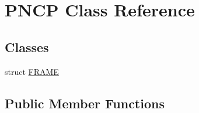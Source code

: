 \hypertarget{class_p_n_c_p}{}\section{P\+N\+CP Class Reference}
\label{class_p_n_c_p}
\subsection*{Classes}
\begin{DoxyCompactItemize}
\item 
struct \hyperlink{struct_p_n_c_p_1_1_f_r_a_m_e}{F\+R\+A\+ME}
\end{DoxyCompactItemize}
\subsection*{Public Member Functions}

